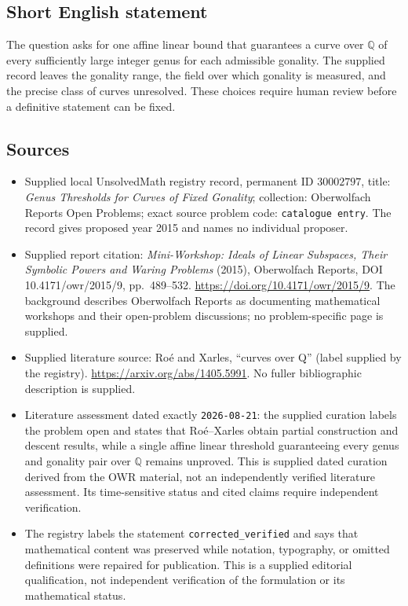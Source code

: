 \documentclass[11pt]{article}
\newcommand{\Q}{\mathbb{Q}}
\begin{document}
\subsection{Short English statement}
The question asks for one affine linear bound that guarantees a curve over \(\Q\) of every sufficiently large integer genus for each admissible gonality. The supplied record leaves the gonality range, the field over which gonality is measured, and the precise class of curves unresolved. These choices require human review before a definitive statement can be fixed.
\subsection{Sources}
\begin{itemize}
\item Supplied local UnsolvedMath registry record, permanent ID \(30002797\), title: \emph{Genus Thresholds for Curves of Fixed Gonality}; collection: Oberwolfach Reports Open Problems; exact source problem code: \texttt{catalogue entry}. The record gives proposed year 2015 and names no individual proposer.
\item Supplied report citation: \emph{Mini-Workshop: Ideals of Linear Subspaces, Their Symbolic Powers and Waring Problems} (2015), Oberwolfach Reports, DOI 10.4171/owr/2015/9, pp.\ 489--532. \url{https://doi.org/10.4171/owr/2015/9}. The background describes Oberwolfach Reports as documenting mathematical workshops and their open-problem discussions; no problem-specific page is supplied.
\item Supplied literature source: Ro\'e and Xarles, ``curves over Q'' (label supplied by the registry). \url{https://arxiv.org/abs/1405.5991}. No fuller bibliographic description is supplied.
\item Literature assessment dated exactly \texttt{2026-08-21}: the supplied curation labels the problem open and states that Ro\'e--Xarles obtain partial construction and descent results, while a single affine linear threshold guaranteeing every genus and gonality pair over \(\Q\) remains unproved. This is supplied dated curation derived from the OWR material, not an independently verified literature assessment. Its time-sensitive status and cited claims require independent verification.
\item The registry labels the statement \texttt{corrected\_verified} and says that mathematical content was preserved while notation, typography, or omitted definitions were repaired for publication. This is a supplied editorial qualification, not independent verification of the formulation or its mathematical status.
\end{itemize}
\end{document}
